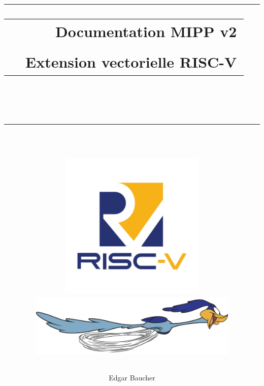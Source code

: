 \documentclass{article}
\begin{document}
\newlength{\larg}
\setlength{\larg}{15.5cm}
 
\title{
\vspace{1cm}
{\rule{\larg}{1mm}}\vspace{7mm}
\begin{tabular}{p{4cm} r}
   & {\Huge {\bf Documentation MIPP v2}} \\
   & \\
   & {\huge Extension vectorielle RISC-V}
\end{tabular}\\
\vspace{2mm}
{\rule{\larg}{1mm}}
\vspace{2mm} \\



\centering 
\includegraphics[width=7cm]{img/riscv.png}\\
\includegraphics[width=10cm]{img/mipp.jpg} 


\vspace{4.0cm}

}

\author{\begin{tabular}{p{13.7cm}}
Edgar Baucher
\end{tabular}\\
\hline }
\date{}
 
\maketitle
\end{document}

